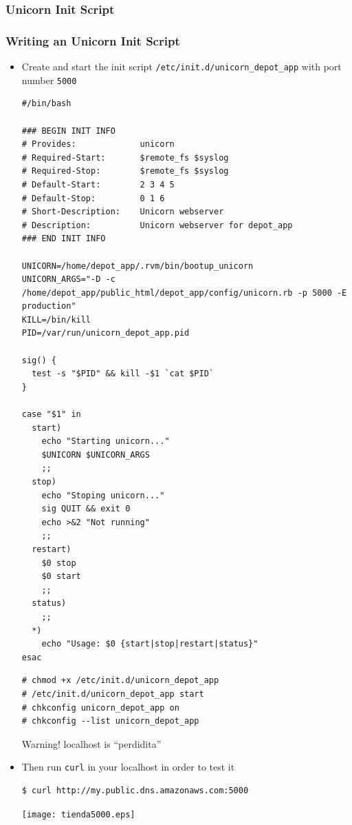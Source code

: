 \documentclass{beamer}
\begin{document}
\subsubsection{Unicorn Init Script}
\begin{frame}
\frametitle{Writing an Unicorn Init Script}
\begin{itemize}
\item Create and start the init script \texttt{/etc/init.d/unicorn\_depot\_app} with port number \texttt{\alert{5000}}
\lstset{language=shell, escapechar=!}
\begin{lstlisting}[escapechar=!]
#/bin/bash

### BEGIN INIT INFO
# Provides:             unicorn
# Required-Start:       $remote_fs $syslog
# Required-Stop:        $remote_fs $syslog
# Default-Start:        2 3 4 5
# Default-Stop:         0 1 6
# Short-Description:    Unicorn webserver
# Description:          Unicorn webserver for depot_app
### END INIT INFO

UNICORN=/home/depot_app/.rvm/bin/bootup_unicorn
UNICORN_ARGS="-D -c /home/depot_app/public_html/depot_app/config/unicorn.rb -p 5000 -E production"
KILL=/bin/kill
PID=/var/run/unicorn_depot_app.pid

sig() {
  test -s "$PID" && kill -$1 `cat $PID`
}

case "$1" in
  start)
    echo "Starting unicorn..."
    $UNICORN $UNICORN_ARGS
    ;;
  stop)
    echo "Stoping unicorn..."
    sig QUIT && exit 0
    echo >&2 "Not running"
    ;;
  restart)
    $0 stop
    $0 start
    ;;
  status)
    ;;
  *)
    echo "Usage: $0 {start|stop|restart|status}"
esac
\end{lstlisting}

\lstset{language=shell, escapechar=!}
\begin{lstlisting}[escapechar=!]
# chmod +x /etc/init.d/unicorn_depot_app
# /etc/init.d/unicorn_depot_app start
# chkconfig unicorn_depot_app on
# chkconfig --list unicorn_depot_app
\end{lstlisting}

\begin{block}{Warning!}
  localhost is ``perdidita''
\end{block}

\item Then run \texttt{curl} in your \alert{localhost} in order to test it

\begin{lstlisting}[escapechar=&]
$ curl http://my.public.dns.amazonaws.com:5000
\end{lstlisting}


\texttt{[image: tienda5000.eps]}

\end{itemize}

\end{frame}
\end{document}
